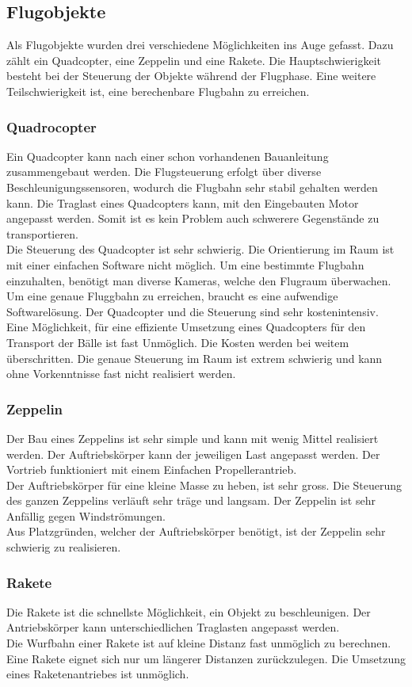 \subsection{Flugobjekte}
Als Flugobjekte wurden drei verschiedene Möglichkeiten ins Auge gefasst. Dazu zählt ein Quadcopter, eine Zeppelin und eine Rakete. Die Hauptschwierigkeit besteht bei der Steuerung der Objekte während der Flugphase. Eine weitere Teilschwierigkeit ist, eine berechenbare Flugbahn zu erreichen. 

\subsubsection{Quadrocopter}
Ein Quadcopter kann nach einer schon vorhandenen Bauanleitung zusammengebaut werden. Die Flugsteuerung erfolgt über diverse Beschleunigungssensoren, wodurch die Flugbahn sehr stabil gehalten werden kann. Die Traglast eines Quadcopters kann, mit den Eingebauten Motor angepasst werden. Somit ist es kein Problem auch schwerere Gegenstände zu transportieren.\\
Die Steuerung des Quadcopter ist sehr schwierig. Die Orientierung im Raum ist mit einer einfachen Software nicht möglich. Um eine bestimmte Flugbahn einzuhalten, benötigt man diverse Kameras, welche den Flugraum überwachen. Um eine genaue Fluggbahn zu erreichen, braucht es eine aufwendige Softwarelösung. Der Quadcopter und die Steuerung sind sehr kostenintensiv.\\
Eine Möglichkeit, für eine effiziente Umsetzung eines Quadcopters für den Transport der Bälle ist fast Unmöglich. Die Kosten werden bei weitem überschritten. Die genaue Steuerung im Raum ist extrem schwierig und kann ohne Vorkenntnisse fast nicht realisiert werden. 


\subsubsection{Zeppelin}
Der Bau eines Zeppelins ist sehr simple und kann mit wenig Mittel realisiert werden. Der Auftriebskörper kann der jeweiligen Last angepasst werden. Der Vortrieb funktioniert mit einem Einfachen Propellerantrieb. \\
Der Auftriebskörper für eine kleine Masse zu heben, ist sehr gross. Die Steuerung des ganzen Zeppelins verläuft sehr träge und langsam. Der Zeppelin ist sehr Anfällig gegen Windströmungen. \\
Aus Platzgründen, welcher der Auftriebskörper benötigt, ist der Zeppelin sehr schwierig zu realisieren. 

\subsubsection{Rakete}
Die Rakete ist die schnellste Möglichkeit, ein Objekt zu beschleunigen. Der Antriebskörper kann unterschiedlichen Traglasten angepasst werden.\\
Die Wurfbahn einer Rakete ist auf kleine Distanz fast unmöglich zu berechnen. Eine Rakete eignet sich nur um längerer Distanzen zurückzulegen. Die Umsetzung eines Raketenantriebes ist unmöglich. 
